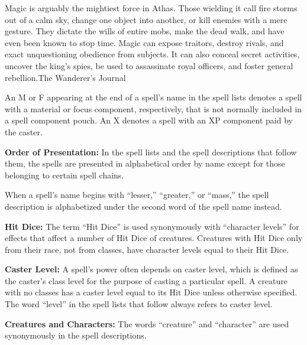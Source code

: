 {Magic is arguably the mightiest force in Athas. Those wielding it call fire storms out of a calm sky, change one object into another, or kill enemies with a mere gesture. They dictate the wills of entire mobs, make the dead walk, and have even been known to stop time. Magic can expose traitors, destroy rivals, and exact unquestioning obedience from subjects. It can also conceal secret activities, uncover the king's spies, be used to assassinate royal officers, and foster general rebellion.}{The Wanderer's Journal}

An M or F appearing at the end of a spell's name in the spell lists denotes a spell with a material or focus component, respectively, that is not normally included in a spell component pouch. An X denotes a spell with an XP component paid by the caster.

\textbf{Order of Presentation:} In the spell lists and the spell descriptions that follow them, the spells are presented in alphabetical order by name except for those belonging to certain spell chains.

When a spell's name begins with ``lesser,'' ``greater,'' or ``mass,'' the spell description is alphabetized under the second word of the spell name instead.

\textbf{Hit Dice:} The term ``Hit Dice'' is used synonymously with ``character levels'' for effects that affect a number of Hit Dice of creatures. Creatures with Hit Dice only from their race, not from classes, have character levels equal to their Hit Dice.

\textbf{Caster Level:} A spell's power often depends on caster level, which is defined as the caster's class level for the purpose of casting a particular spell. A creature with no classes has a caster level equal to its Hit Dice unless otherwise specified. The word ``level'' in the spell lists that follow always refers to caster level.

\textbf{Creatures and Characters:} The words ``creature'' and ``character'' are used synonymously in the spell descriptions.








